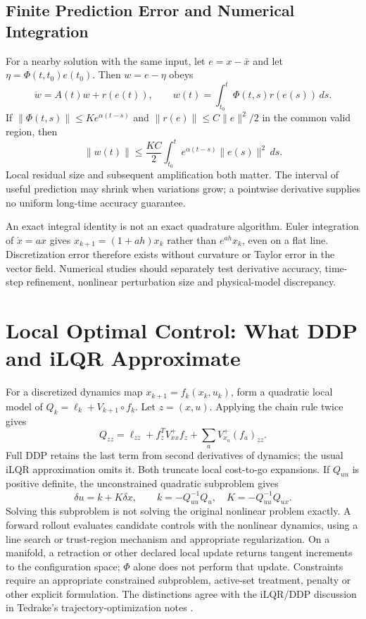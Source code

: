\subsection{Finite Prediction Error and Numerical Integration}

For a nearby solution with the same input, let $e=x-\bar x$ and let
$\eta=\Phi(t,t_0)e(t_0)$. Then $w=e-\eta$ obeys
\[
\dot w=A(t)w+r(e(t)),\qquad
w(t)=\int_{t_0}^t\Phi(t,s)r(e(s))\,ds.
\]
If $\|\Phi(t,s)\|\leq K e^{\alpha(t-s)}$ and $\|r(e)\|\leq C\|e\|^2/2$ in the
common valid region, then
\[
\|w(t)\|\leq\frac{KC}{2}\int_{t_0}^t e^{\alpha(t-s)}\|e(s)\|^2\,ds.
\]
Local residual size and subsequent amplification both matter. The interval of useful
prediction may shrink when variations grow; a pointwise derivative supplies no uniform
long-time accuracy guarantee.

An exact integral identity is not an exact quadrature algorithm. Euler integration of
$\dot x=ax$ gives $x_{k+1}=(1+ah)x_k$ rather than $e^{ah}x_k$, even on a flat line.
Discretization error therefore exists without curvature or Taylor error in the vector
field. Numerical studies should separately test derivative accuracy, time-step refinement,
nonlinear perturbation size and physical-model discrepancy.

\section{Local Optimal Control: What DDP and iLQR Approximate}

For a discretized dynamics map $x_{k+1}=f_k(x_k,u_k)$, form a quadratic local model of
$Q_k=\ell_k+V_{k+1}\circ f_k$. Let $z=(x,u)$. Applying the chain rule twice gives
\[
Q_{zz}=\ell_{zz}+f_z^TV_{xx}^{+}f_z+\sum_a V_{x_a}^{+}(f_a)_{zz}.
\]
Full DDP retains the last term from second derivatives of dynamics; the usual iLQR
approximation omits it. Both truncate local cost-to-go expansions. If $Q_{uu}$ is
positive definite, the unconstrained quadratic subproblem gives
\[
\delta u=k+K\delta x,\qquad k=-Q_{uu}^{-1}Q_u,\quad K=-Q_{uu}^{-1}Q_{ux}.
\]
Solving this subproblem is not solving the original nonlinear problem exactly. A forward
rollout evaluates candidate controls with the nonlinear dynamics, using a line search or
trust-region mechanism and appropriate regularization. On a manifold, a retraction or
other declared local update returns tangent increments to the configuration space;
$\Phi$ alone does not perform that update. Constraints require an appropriate constrained
subproblem, active-set treatment, penalty or other explicit formulation. The distinctions
agree with the iLQR/DDP discussion in Tedrake's trajectory-optimization notes
\cite{TedrakeTrajectoryFoundations}.

